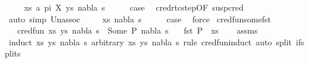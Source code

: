 \begin{isabellebody}
\isamarkupfalse%
\isanewline
\ \ \isamarkupfalse%
\ {\isacharparenleft}{\kern0pt}{}\ xs\ a\ pi\ X\ ys\ nabla\ s{\isacharparenright}{\kern0pt}\isanewline
\ \ \isamarkupfalse%
\ \isamarkupfalse%
\ {\isacharquery}{\kern0pt}case\ \isamarkupfalse%
\ cred{\isacharunderscore}{\kern0pt}rtc{\isacharunderscore}{\kern0pt}step{\isacharbrackleft}{\kern0pt}OF\ susp{\isacharunderscore}{\kern0pt}cred{\isacharbrackright}{\kern0pt}\ \isamarkupfalse%
\ {\isacharparenleft}{\kern0pt}auto\ simp{\isacharcolon}{\kern0pt}\ Un{\isacharunderscore}{\kern0pt}assoc{\isacharparenright}{\kern0pt}\isanewline
{}\isamarkupfalse%
\isanewline
\ \ \isamarkupfalse%
\ {\isacharparenleft}{\kern0pt}{}\ xs\ nabla\ s{\isacharparenright}{\kern0pt}\isanewline
\ \ \isamarkupfalse%
\ \isamarkupfalse%
\ {\isacharquery}{\kern0pt}case\ \isamarkupfalse%
\ force\isanewline
{}\isamarkupfalse%
%
\endisatagproof
{\isafoldproof}%
%
\isadelimproof
\isanewline
%
\endisadelimproof
\isanewline
{}\isamarkupfalse%
\ cred{\isacharunderscore}{\kern0pt}fun{\isacharunderscore}{\kern0pt}some{\isacharunderscore}{\kern0pt}fst{\isacharcolon}{\kern0pt}\isanewline
\ \ \ {\isachardoublequoteopen}cred{\isacharunderscore}{\kern0pt}fun\ {\isacharparenleft}{\kern0pt}{\isacharparenleft}{\kern0pt}xs{\isacharcomma}{\kern0pt}\ ys{\isacharparenright}{\kern0pt}{\isacharcomma}{\kern0pt}\ nabla{\isacharcomma}{\kern0pt}\ s{\isacharparenright}{\kern0pt}\ {\isacharequal}{\kern0pt}\ Some\ {\isacharparenleft}{\kern0pt}P{\isacharprime}{\kern0pt}{\isacharcomma}{\kern0pt}\ nabla{\isacharprime}{\kern0pt}{\isacharcomma}{\kern0pt}\ s{\isacharprime}{\kern0pt}{\isacharparenright}{\kern0pt}{\isachardoublequoteclose}\isanewline
\ \ \ {\isachardoublequoteopen}fst\ P{\isacharprime}{\kern0pt}\ {\isacharequal}{\kern0pt}\ xs{\isachardoublequoteclose}\isanewline
%
\isadelimproof
\ \ %
\endisadelimproof
%
\isatagproof
{}\isamarkupfalse%
\ assms\ \isanewline
\ \ \isamarkupfalse%
\ {\isacharparenleft}{\kern0pt}induct\ {\isachardoublequoteopen}{\isacharparenleft}{\kern0pt}{\isacharparenleft}{\kern0pt}xs{\isacharcomma}{\kern0pt}\ ys{\isacharparenright}{\kern0pt}{\isacharcomma}{\kern0pt}\ nabla{\isacharcomma}{\kern0pt}\ s{\isacharparenright}{\kern0pt}{\isachardoublequoteclose}\ arbitrary{\isacharcolon}{\kern0pt}\ xs\ ys\ nabla\ s\ rule{\isacharcolon}{\kern0pt}\ cred{\isacharunderscore}{\kern0pt}fun{\isachardot}{\kern0pt}induct{\isacharcomma}{\kern0pt}\ auto\ split{\isacharcolon}{\kern0pt}\ if{\isacharunderscore}{\kern0pt}splits{\isacharparenright}{\kern0pt}%

\end{isabellebody}
